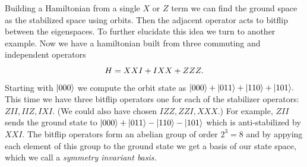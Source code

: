 \documentclass[12pt]{article}
\begin{document}
Building a Hamiltonian from a single $X$ or $Z$ term
we can find the ground space as the stabilized space
using orbits. Then the adjacent operator acts to bitflip
between the eigenspaces.
To further elucidate this idea we turn to another example.
Now we have a hamiltonian built from three commuting and
independent operators 
$$
    H = XXI + IXX + ZZZ.
$$
Starting with $|{000}\rangle$ we compute the orbit state
as $|{000}\rangle+|{011}\rangle+|{110}\rangle+|{101}\rangle.$
This time we have three bitflip operators
one for each of the stabilizer operators:
$ZII, IIZ, IXI.$
(We could also have chosen $IZZ, ZZI, XXX.$)
For example, $ZII$ sends the ground state to
$|{000}\rangle+|{011}\rangle-|{110}\rangle-|{101}\rangle$
which is anti-stabilized by $XXI.$
The bitflip operators form an abelian group of
order $2^3 = 8$ and by appying each element of
this group to the ground state we get a basis
of our state space, which we call a \emph{symmetry
invariant basis.}
\end{document}
